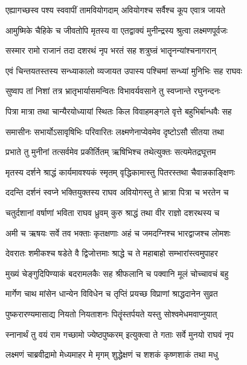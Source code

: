 \twolineshloka
{एह्यागच्छस्व पश्य स्ववापीं तामवियोगदाम्}
{अवियोगश्च सर्वैश्च कूप एवात्र जायते} %

\twolineshloka
{आमुष्मिके चैहिके च जीवतोपि मृतस्य वा}
{एतद्वाक्यं मुनीन्द्रस्य श्रुत्वा लक्ष्मणपूर्वजः} %

\twolineshloka
{सस्मार रामो राजानं तदा दशरथं नृप}
{भरतं सह शत्रुघ्न्रं भातॄनन्यांश्चनागरान्} %

\twolineshloka
{एवं चिन्तयतस्तस्य सन्ध्याकालो व्यजायत}
{उपास्य पश्चिमां सन्ध्यां मुनिभिः सह राघवः} %

\twolineshloka
{सुष्वाप तां निशां तत्र भ्रातृभार्यासमन्वितः}
{विभावर्यवसाने तु स्वप्नान्ते रघुनन्दनः} %

\twolineshloka
{पित्रा मात्रा तथा चान्यैरयोध्यायां स्थितः किल}
{विवाहमङ्गले वृत्ते बहुभिर्बान्धवैः सह} %

\twolineshloka
{समासीनः सभार्योऽसावृषिभिः परिवारितः}
{लक्ष्मणेनाप्येवमेव दृष्टोऽसौ सीतया तथा} %

\twolineshloka
{प्रभाते तु मुनीनां तत्सर्वमेव प्रकीर्तितम्}
{ऋषिभिश्च तथेत्युक्तः सत्यमेतद्रघूत्तम} %

\twolineshloka
{मृतस्य दर्शने श्राद्धं कार्यमावश्यकं स्मृतम्}
{वृद्धिकामास्तु पितरस्तथा चैवान्नकाङ्क्षिणः} %

\twolineshloka
{ददन्ति दर्शनं स्वप्ने भक्तियुक्तस्य राघव}
{अवियोगस्तु ते भ्रात्रा पित्रा च भरतेन च} %

\twolineshloka
{चतुर्दशानां वर्षाणां भविता राघव ध्रुवम्}
{कुरु श्राद्धं तथा वीर राज्ञो दशरथस्य च} %

\twolineshloka
{अमी च ऋषयः सर्वे तव भक्ताः कृतक्षणाः}
{अहं च जमदग्निश्च भारद्वाजश्च लोमशः} %

\twolineshloka
{देवरातः शमीकश्च षडेते वै द्विजोत्तमाः}
{श्राद्धे च ते महाबाहो सम्भारांस्त्वमुपाहर} %

\twolineshloka
{मुख्यं चेङ्गुदिपिण्याकं बदरामलकैः सह}
{श्रीफलानि च पक्वानि मूलं चोच्चावचं बहु} %

\twolineshloka
{मार्गेण चाथ मांसेन धान्येन विविधेन च}
{तृप्तिं प्रयच्छ विप्राणां श्राद्धदानेन सुव्रत} %

\twolineshloka
{पुष्करारण्यमासाद्य नियतो नियताशनः}
{पितॄंस्तर्पयते यस्तु सोश्वमेधमवाप्नुयात्} %

\twolineshloka
{स्नानार्थं तु वयं राम गच्छामो ज्येष्ठपुष्करम्}
{इत्युक्त्वा ते गताः सर्वे मुनयो राघवं नृप} %

\twolineshloka
{लक्ष्मणं चाब्रवीद्रामो मेध्यमाहर मे मृगम्}
{शुद्धेक्षणं च शशकं कृष्णशाकं तथा मधु} %

